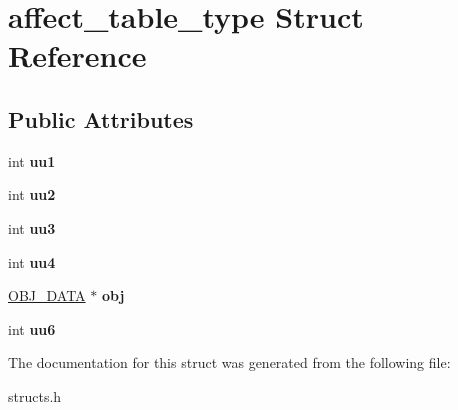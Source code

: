 \hypertarget{structaffect__table__type}{\section{affect\-\_\-table\-\_\-type Struct Reference}
\label{structaffect__table__type}
}
\subsection*{Public Attributes}
\begin{DoxyCompactItemize}
\item 
\hypertarget{structaffect__table__type_a8c38c178a0ece5ef7d6fc112ad75bb90}{int {\bfseries uu1}}\label{structaffect__table__type_a8c38c178a0ece5ef7d6fc112ad75bb90}

\item 
\hypertarget{structaffect__table__type_a22a0b69158737bacc1bf91e61029717e}{int {\bfseries uu2}}\label{structaffect__table__type_a22a0b69158737bacc1bf91e61029717e}

\item 
\hypertarget{structaffect__table__type_aaa0866244c05c72d3df1eda5350d93e3}{int {\bfseries uu3}}\label{structaffect__table__type_aaa0866244c05c72d3df1eda5350d93e3}

\item 
\hypertarget{structaffect__table__type_a6b9c22c73d122493d36c039cce1e6e92}{int {\bfseries uu4}}\label{structaffect__table__type_a6b9c22c73d122493d36c039cce1e6e92}

\item 
\hypertarget{structaffect__table__type_a44016d5bfa098899c9afa9bf397668a1}{\hyperlink{structobj__data}{O\-B\-J\-\_\-\-D\-A\-T\-A} $\ast$ {\bfseries obj}}\label{structaffect__table__type_a44016d5bfa098899c9afa9bf397668a1}

\item 
\hypertarget{structaffect__table__type_aa47ec4b4ee8d20202a044673e8165882}{int {\bfseries uu6}}\label{structaffect__table__type_aa47ec4b4ee8d20202a044673e8165882}

\end{DoxyCompactItemize}


The documentation for this struct was generated from the following file\-:\begin{DoxyCompactItemize}
\item 
structs.\-h\end{DoxyCompactItemize}

